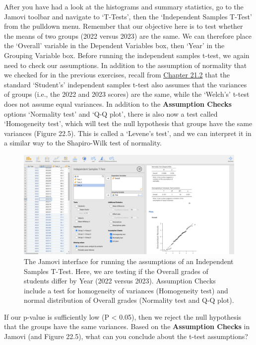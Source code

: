 \documentclass[
]{scrbook}
\begin{document}
After you have had a look at the histograms and summary statistics, go to the Jamovi toolbar and navigate to `T-Tests', then the `Independent Samples T-Test' from the pulldown menu.
Remember that our objective here is to test whether the means of two groups (2022 versus 2023) are the same.
We can therefore place the `Overall' variable in the Dependent Variables box, then `Year' in the Grouping Variable box.
Before running the independent samples t-test, we again need to check our assumptions.
In addition to the assumption of normality that we checked for in the previous exercises, recall from \protect\hyperlink{independent-samples-t-test}{Chapter 21.2} that the standard `Student's' independent samples t-test also assumes that the variances of groups (i.e., the 2022 and 2023 scores) are the same, while the `Welch's' t-test does not assume equal variances.
In addition to the \textbf{Assumption Checks} options `Normality test' and `Q-Q plot', there is also now a test called `Homogeneity test', which will test the null hypothesis that groups have the same variances (Figure 22.5).
This is called a `Levene's test', and we can interpret it in a similar way to the Shapiro-Wilk test of normality.

\begin{figure}
\includegraphics[width=1\linewidth]{img/jamovi_independent_sample_t-test} \caption{The Jamovi interface for running the assumptions of an Independent Samples T-Test. Here, we are testing if the Overall grades of students differ by Year (2022 versus 2023). Assumption Checks include a test for homogeneity of variances (Homogeneity test) and normal distribution of Overall grades (Normality test and Q-Q plot).}\label{fig:unnamed-chunk-104}
\end{figure}

If our p-value is sufficiently low (P \textless{} 0.05), then we reject the null hypothesis that the groups have the same variances.
Based on the \textbf{Assumption Checks} in Jamovi (and Figure 22.5), what can you conclude about the t-test assumptions?
\end{document}

